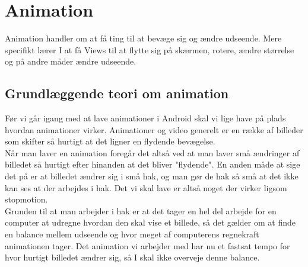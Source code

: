 
\chapter{Animation}
Animation handler om at få ting til at bevæge sig og ændre udseende. Mere specifikt lærer I at få Views til at flytte sig på skærmen, rotere, ændre størrelse og på andre måder ændre udseende.
\section{Grundlæggende teori om animation}
Før vi går igang med at lave animationer i Android skal vi lige have på plads hvordan animationer virker.
Animationer og video generelt er en række af billeder som skifter så hurtigt at det ligner en flydende bevægelse. \\
Når man laver en animation foregår det altså ved at man laver små ændringer af billedet så hurtigt efter hinanden at det bliver "flydende". En anden måde at sige det på er at billedet ændrer sig i små hak, og man gør de hak så små at det ikke kan ses at der arbejdes i hak. Det vi skal lave er altså noget der virker ligsom stopmotion. \\
Grunden til at man arbejder i hak er at det tager en hel del arbejde for en computer  at udregne hvordan den skal vise et billede, så det gælder om at finde en balance mellem udseende og hvor meget af computerens regnekraft animationen tager. Det animation vi arbejder med har nu et fastsat tempo for hvor hurtigt billedet ændrer sig, så I skal ikke overveje denne balance.
